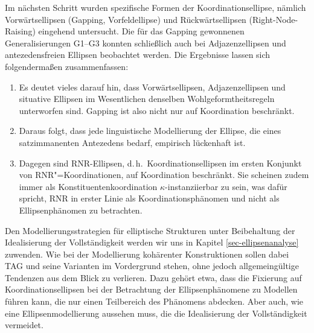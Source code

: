 Im nächsten Schritt wurden spezifische Formen der Koordinationsellipse, nämlich Vorwärtsellipsen (Gapping, Vorfeldellipse) und Rückwärtsellipsen (Right-Node-Raising) eingehend untersucht. Die für das Gapping gewonnenen Generalisierungen G1--G3 konnten schlie\ss lich auch bei Adjazenzellipsen und antezedensfreien Ellipsen beobachtet werden. Die Ergebnisse lassen sich folgendermaßen zusammenfassen:

\begin{enumerate}
	\item  Es deutet vieles darauf hin, dass Vorwärtsellipsen, Adjazenzellipsen und situative Ellipsen im Wesentlichen denselben Wohlgeformtheitsregeln unterworfen sind. Gapping ist also nicht nur auf Koordination beschränkt.
  \item Daraus folgt, dass jede linguistische Modellierung der Ellipse, die eines satzimmanenten Antezedens bedarf, empirisch lückenhaft ist. 
  \item Dagegen sind RNR-Ellipsen, d.\,h.\ Koordinationsellipsen im ersten Konjunkt von RNR"=Koordinationen, auf Koordination beschränkt. Sie scheinen zudem immer als Konstituentenkoordination $\kappa$-instanziierbar zu sein, was dafür spricht, RNR in erster Linie als Koordinationsphänomen und nicht als Ellipsenphänomen zu betrachten.

\end{enumerate}

Den Modellierungsstrategien für elliptische Strukturen unter Beibehaltung der Idealisierung der Vollständigkeit werden wir uns in Kapitel \ref{sec-ellipsenanalyse} zuwenden. Wie bei der Modellierung kohärenter Konstruktionen sollen dabei TAG und seine Varianten im Vordergrund stehen, ohne jedoch allgemeingültige Tendenzen aus dem Blick zu verlieren. Dazu gehört etwa, dass die Fixierung auf Koordinationsellipsen bei der Betrachtung der Ellipsenphänomene zu Modellen führen kann, die nur einen Teilbereich des Phänomens abdecken. Aber auch, wie eine Ellipsenmodellierung aussehen muss, die die Idealisierung der Vollständigkeit vermeidet.

 











